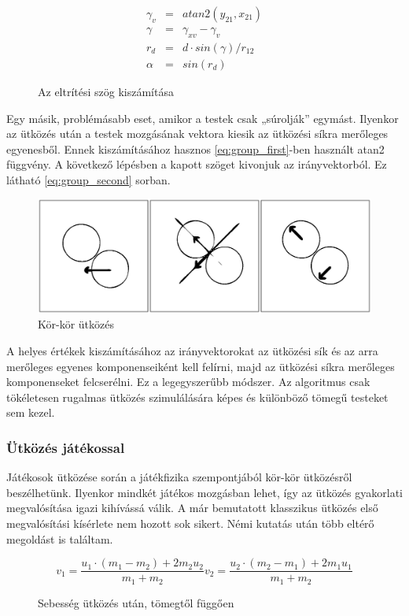 \documentclass[bibliography=totocnumbered]{article}
\begin{document}
\begin{figure}[ht]
	\caption{Az eltrítési szög kiszámítása}
	\label{kepletcsoport}
	\begin{eqnarray}
	\label{eq:group_first}
	\gamma_v & = & atan2(y_{21}, x_{21}) \\
	\label{eq:group_second}
	\gamma & = & \gamma_{xv} - \gamma_v \\
	r_d & = & d \cdot sin(\gamma)/r_{12} \\
	\alpha & = & sin(r_d)
	\end{eqnarray}

\end{figure}

Egy másik, problémásabb eset, amikor a testek csak „súrolják'' egymást.
Ilyenkor az ütközés után a testek mozgásának vektora kiesik az ütközési
síkra merőleges egyenesből. Ennek kiszámításához hasznos \ref{eq:group_first}-ben használt
 atan2 függvény. A következő lépésben a kapott szöget kivonjuk az irányvektorból. Ez látható \ref{eq:group_second} sorban.

\begin{figure}[ht]
	\caption{Kör-kör ütközés}
	\label{kor:utk}
	\includegraphics[scale=0.6]{media/image8.eps}
\end{figure}

A helyes értékek kiszámításához az irányvektorokat az ütközési sík és az
arra merőleges egyenes komponenseiként kell felírni, majd az ütközési
síkra merőleges komponenseket felcserélni. Ez a legegyszerűbb módszer.
Az algoritmus csak tökéletesen rugalmas ütközés szimulálására képes és
különböző tömegű testeket sem kezel.


\subsubsection{Ütközés
játékossal}

Játékosok ütközése során a játékfizika szempontjából kör-kör ütközésről
beszélhetünk. Ilyenkor mindkét játékos mozgásban lehet, így az ütközés
gyakorlati megvalósítása igazi kihívássá válik. A már bemutatott
klasszikus ütközés első megvalósítási kísérlete nem hozott sok sikert.
Némi kutatás után több eltérő megoldást is találtam.
\begin{figure}[ht]
	\caption{Sebesség ütközés után, tömegtől függően}
	\label{keplet}
\begin{equation}
\label{eq:single}
v_1=\frac{u_1\cdot (m_1 - m_2) + 2m_2 u_2}{m_1 + m_2} 
v_2=\frac{u_2\cdot (m_2 - m_1) + 2m_1 u_1}{m_1 + m_2}
\end{equation}

\end{figure}
\end{document}
